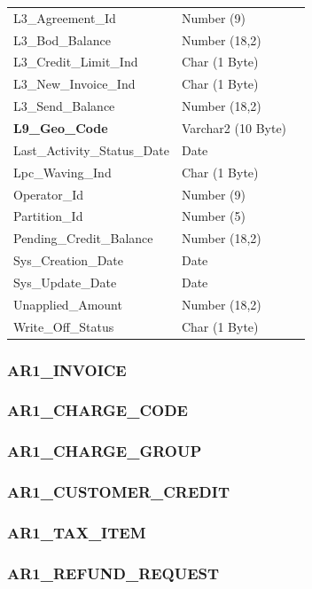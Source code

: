 \documentclass[12pt,twoside]{article}
\begin{document}
\begin{longtable}{l|l|l}
L3\_Agreement\_Id & Number (9) & \\
L3\_Bod\_Balance & Number (18,2) & \\
L3\_Credit\_Limit\_Ind & Char (1 Byte) & \\
L3\_New\_Invoice\_Ind & Char (1 Byte) & \\
L3\_Send\_Balance & Number (18,2) & \\
\textbf{L9\_Geo\_Code} & Varchar2 (10 Byte) & \\
Last\_Activity\_Status\_Date & Date & \\
Lpc\_Waving\_Ind & Char (1 Byte) & \\
Operator\_Id & Number (9) & \\
Partition\_Id & Number (5) & \\
Pending\_Credit\_Balance & Number (18,2) & \\
Sys\_Creation\_Date & Date & \\
Sys\_Update\_Date & Date & \\
Unapplied\_Amount & Number (18,2) & \\
Write\_Off\_Status & Char (1 Byte) & \\
\hline
\end{longtable}
\normalsize
\subsubsection{AR1\_INVOICE}
\label{sec:orgheadline88}
\subsubsection{AR1\_CHARGE\_CODE}
\label{sec:orgheadline89}

\subsubsection{AR1\_CHARGE\_GROUP}
\label{sec:orgheadline90}

\subsubsection{AR1\_CUSTOMER\_CREDIT}
\label{sec:orgheadline91}
\subsubsection{AR1\_TAX\_ITEM}
\label{sec:orgheadline92}

\subsubsection{AR1\_REFUND\_REQUEST}
\label{sec:orgheadline93}
\end{document}
